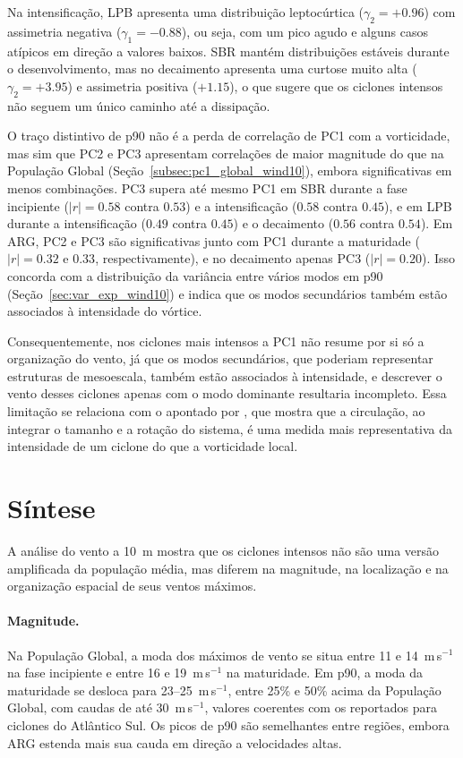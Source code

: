 Na intensificação, LPB apresenta uma distribuição leptocúrtica ($\gamma_2 = +0.96$) com assimetria negativa ($\gamma_1 = -0.88$), ou seja, com um pico agudo e alguns casos atípicos em direção a valores baixos. SBR mantém distribuições estáveis durante o desenvolvimento, mas no decaimento apresenta uma curtose muito alta ($\gamma_2 = +3.95$) e assimetria positiva ($+1.15$), o que sugere que os ciclones intensos não seguem um único caminho até a dissipação.

O traço distintivo de p90 não é a perda de correlação de PC1 com a vorticidade, mas sim que PC2 e PC3 apresentam correlações de maior magnitude do que na População Global (Seção~\ref{subsec:pc1_global_wind10}), embora significativas em menos combinações. PC3 supera até mesmo PC1 em SBR durante a fase incipiente ($|r|=0.58$ contra $0.53$) e a intensificação ($0.58$ contra $0.45$), e em LPB durante a intensificação ($0.49$ contra $0.45$) e o decaimento ($0.56$ contra $0.54$). Em ARG, PC2 e PC3 são significativas junto com PC1 durante a maturidade ($|r|=0.32$ e $0.33$, respectivamente), e no decaimento apenas PC3 ($|r|=0.20$). Isso concorda com a distribuição da variância entre vários modos em p90 (Seção~\ref{sec:var_exp_wind10}) e indica que os modos secundários também estão associados à intensidade do vórtice.

Consequentemente, nos ciclones mais intensos a PC1 não resume por si só a organização do vento, já que os modos secundários, que poderiam representar estruturas de mesoescala, também estão associados à intensidade, e descrever o vento desses ciclones apenas com o modo dominante resultaria incompleto. Essa limitação se relaciona com o apontado por \citet{sinclair1997objective}, que mostra que a circulação, ao integrar o tamanho e a rotação do sistema, é uma medida mais representativa da intensidade de um ciclone do que a vorticidade local.

\section{Síntese}\label{sec:sintesis_wind10}

A análise do vento a 10~m mostra que os ciclones intensos não são uma versão amplificada da população média, mas diferem na magnitude, na localização e na organização espacial de seus ventos máximos.

\paragraph{Magnitude.}
Na População Global, a moda dos máximos de vento se situa entre 11 e 14~m\,s$^{-1}$ na fase incipiente e entre 16 e 19~m\,s$^{-1}$ na maturidade. Em p90, a moda da maturidade se desloca para 23--25~m\,s$^{-1}$, entre 25\% e 50\% acima da População Global, com caudas de até 30~m\,s$^{-1}$, valores coerentes com os reportados para ciclones do Atlântico Sul. Os picos de p90 são semelhantes entre regiões, embora ARG estenda mais sua cauda em direção a velocidades altas.

